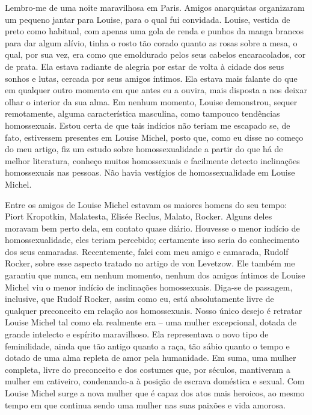 Lembro-me de uma noite maravilhosa em Paris. Amigos anarquistas
organizaram um pequeno jantar para Louise, para o qual fui convidada.
Louise, vestida de preto como habitual, com apenas uma gola de renda e
punhos da manga brancos para dar algum alívio, tinha o rosto tão corado
quanto as rosas sobre a mesa, o qual, por sua vez, era como que
emoldurado pelos seus cabelos encaracolados, cor de prata. Ela estava
radiante de alegria por estar de volta à cidade dos seus sonhos e lutas,
cercada por seus amigos íntimos. Ela estava mais falante do que em
qualquer outro momento em que antes eu a ouvira, mais disposta a nos
deixar olhar o interior da sua alma. Em nenhum momento, Louise
demonstrou, sequer remotamente, alguma característica masculina, como
tampouco tendências homossexuais. Estou certa de que tais indícios não
teriam me escapado se, de fato, estivessem presentes em Louise Michel,
posto que, como eu disse no começo do meu artigo, fiz um estudo sobre
homossexualidade a partir do que há de melhor literatura, conheço muitos
homossexuais e facilmente detecto inclinações homossexuais nas pessoas.
Não havia vestígios de homossexualidade em Louise Michel.

Entre os amigos de Louise Michel estavam os maiores homens do seu tempo:
Piort Kropotkin, Malatesta, Elisée Reclus, Malato, Rocker. Alguns deles
moravam bem perto dela, em contato quase diário. Houvesse o menor
indício de homossexualidade, eles teriam percebido; certamente isso
seria do conhecimento dos seus camaradas. Recentemente, falei com meu
amigo e camarada, Rudolf Rocker, sobre esse aspecto tratado no artigo de
von Levetzow. Ele também me garantiu que nunca, em nenhum momento,
nenhum dos amigos íntimos de Louise Michel viu o menor indício de
inclinações homossexuais. Diga-se de passagem, inclusive, que Rudolf
Rocker, assim como eu, está absolutamente livre de qualquer preconceito
em relação aos homossexuais. Nosso único desejo é retratar Louise Michel
tal como ela realmente era -- uma mulher excepcional, dotada de grande
intelecto e espírito maravilhoso. Ela representava o novo tipo de
feminilidade, ainda que tão antigo quanto a raça, tão sábio quanto o
tempo e dotado de uma alma repleta de amor pela humanidade. Em suma, uma
mulher completa, livre do preconceito e dos costumes que, por séculos,
mantiveram a mulher em cativeiro, condenando-a à posição de escrava
doméstica e sexual. Com Louise Michel surge a nova mulher que é capaz
dos atos mais heroicos, ao mesmo tempo em que continua sendo uma mulher
nas suas paixões e vida amorosa.

